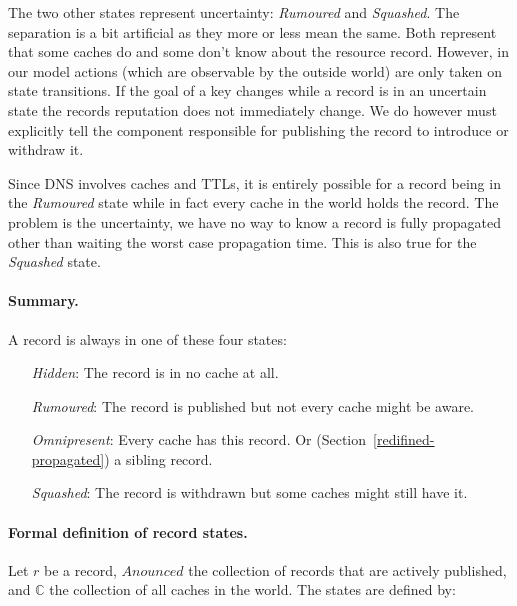 \documentclass[twoside,english, a4paper]{article}
\begin{document}
The two other states represent uncertainty: \emph{Rumoured} and \emph
{Squashed}. The separation is a bit artificial as they more or less 
mean the same. Both represent that some caches do and some don't 
know about the resource record. However, in our model actions (which 
are observable by the outside world) are only taken on state 
transitions. If the goal of a key changes while a record is in an 
uncertain state the records reputation does not immediately change. We 
do however must explicitly tell the component responsible for 
publishing the record to introduce or withdraw it. 

Since DNS involves caches and TTLs, it is entirely possible for a 
record being in the \emph{Rumoured} state while in fact every cache 
in the world holds the record. The problem is the uncertainty, we have
no way to know a record is fully propagated other than waiting the
worst case propagation time. This is also true for the \emph{Squashed}
state.

\paragraph{Summary.} A record is always in one of these four states:

\begin{itemize}
       \item[\emph{Hidden}:] 		
			The record is in no cache at all.
       \item[\emph{Rumoured}:] 		
			The record is published but not every cache might be aware.
\item[\emph{Omnipresent}:]
			Every cache has this record.
			Or (Section~\ref{redifined-propagated}) a
			sibling record.
\item[\emph{Squashed}:]
			The record is withdrawn but some caches might still have it.
\end{itemize} 

\paragraph{Formal definition of record states.} Let $r$ be a record, $Anounced$ the 
collection of records that are actively published, and $\mathbb{C}$
the collection of all caches in the world. The states are defined by:
\end{document}
